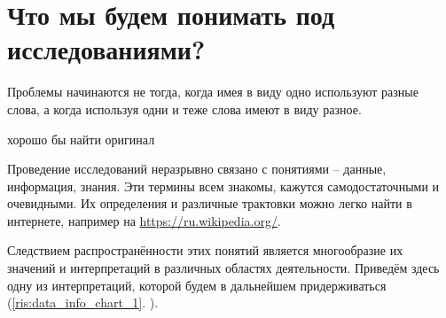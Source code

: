 \section{Что мы будем понимать под исследованиями?}

\epigraph{Проблемы начинаются не тогда, когда имея в виду одно используют разные слова, а когда используя одни и теже слова имеют в виду разное.}{хорошо бы найти оригинал}

Проведение исследований неразрывно связано с понятиями -- данные, информация, знания. Эти термины всем знакомы, кажутся самодостаточными и очевидными. Их определения и различные трактовки можно легко найти в интернете, например на \url{https://ru.wikipedia.org/}.


Следствием распространённости этих понятий является многообразие их значений и интерпретаций в различных областях деятельности. Приведём здесь одну из интерпретаций, которой будем в дальнейшем придерживаться (\ref{ris:data_info_chart_1}. ). 

